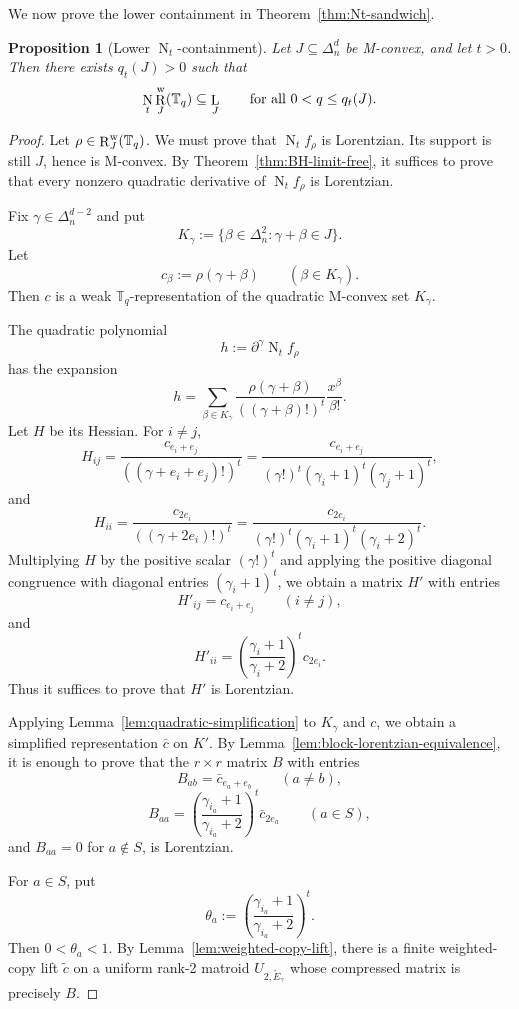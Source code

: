 \documentclass[12pt]{amsart}
\newtheorem{proposition}[theorem]{Proposition}
\theoremstyle{definition}
\newcommand{\1}{\mathbf{1}}
\DeclareMathOperator{\upN}{N}   %
\DeclareMathOperator{\upL}{L}   %
\DeclareMathOperator{\upR}{R}   %
\newcommand\T{{\mathbb T}}
\begin{document}
We now prove the lower containment in Theorem~\ref{thm:Nt-sandwich}.

\begin{proposition}[Lower $\upN_t$-containment]
\label{prop:lower-Nt}
Let $J\subseteq \Delta_n^d$ be M-convex, and let $t>0$.  Then there exists
$q_t(J)>0$ such that
\[
\upN_t\upR_J^{\rm w}(\T_q)\subseteq \upL_J
\qquad\text{for all }0<q\le q_t(J).
\]
\end{proposition}

\begin{proof}
Let $\rho\in \upR_J^{\rm w}(\T_q)$.  We must prove that $\upN_t f_\rho$ is
Lorentzian.  Its support is still $J$, hence is M-convex.  By Theorem~\ref{thm:BH-limit-free}, 
it suffices to prove that every nonzero quadratic derivative of $\upN_t f_\rho$ is Lorentzian.

Fix $\gamma\in\Delta_n^{d-2}$ and put
\[
K_\gamma:=\{\beta\in\Delta_n^2:\gamma+\beta\in J\}.
\]
Let
\[
c_\beta:=\rho(\gamma+\beta)
\qquad(\beta\in K_\gamma).
\]
Then $c$ is a weak $\T_q$-representation of the quadratic M-convex set
$K_\gamma$.

The quadratic polynomial
\[
h:=\partial^\gamma\upN_t f_\rho
\]
has the expansion
\[
h=
\sum_{\beta\in K_\gamma}
\frac{\rho(\gamma+\beta)}{((\gamma+\beta)!)^t}
\frac{x^\beta}{\beta!}.
\]
Let $H$ be its Hessian.  For $i\ne j$,
\[
H_{ij}
=
\frac{c_{e_i+e_j}}{((\gamma+e_i+e_j)!)^t}
=
\frac{c_{e_i+e_j}}
{(\gamma!)^t(\gamma_i+1)^t(\gamma_j+1)^t},
\]
and
\[
H_{ii}
=
\frac{c_{2e_i}}{((\gamma+2e_i)!)^t}
=
\frac{c_{2e_i}}
{(\gamma!)^t(\gamma_i+1)^t(\gamma_i+2)^t}.
\]
Multiplying $H$ by the positive scalar $(\gamma!)^t$ and applying the positive
diagonal congruence with diagonal entries $(\gamma_i+1)^t$, we obtain a matrix
$H'$ with entries
\[
H'_{ij}=c_{e_i+e_j}
\qquad(i\ne j),
\]
and
\[
H'_{ii}
=
\left(\frac{\gamma_i+1}{\gamma_i+2}\right)^t c_{2e_i}.
\]
Thus it suffices to prove that $H'$ is Lorentzian.

Applying Lemma~\ref{lem:quadratic-simplification} to $K_\gamma$ and $c$, we obtain
a simplified representation $\bar c$ on $K'$.  By
Lemma~\ref{lem:block-lorentzian-equivalence}, it is enough to prove that the
$r\times r$ matrix $B$ with entries
\[
B_{ab}=\bar c_{e_a+e_b}\qquad(a\ne b),
\]
\[
B_{aa}
=
\left(\frac{\gamma_{i_a}+1}{\gamma_{i_a}+2}\right)^t
\bar c_{2e_a}
\qquad(a\in S),
\]
and $B_{aa}=0$ for $a\notin S$, is Lorentzian.

For $a\in S$, put
\[
\theta_a:=
\left(\frac{\gamma_{i_a}+1}{\gamma_{i_a}+2}\right)^t.
\]
Then $0<\theta_a<1$.  By Lemma~\ref{lem:weighted-copy-lift}, there is a finite weighted-copy lift $\tilde c$ on a uniform
rank-2 matroid $U_{2,\widetilde E_\gamma}$ whose compressed matrix is precisely
$B$.  


\end{proof}
\end{document}
